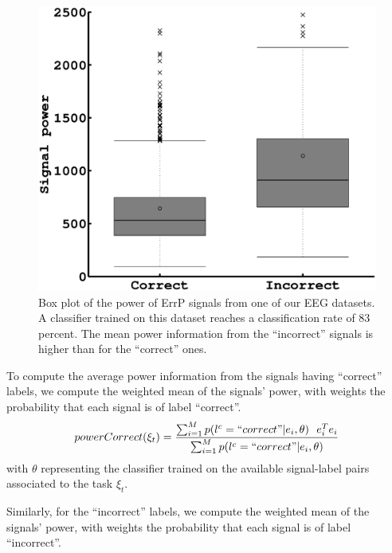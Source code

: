 \begin{figure}[!htbp]
\centering
\includegraphics[width=\columnwidth]{figures/power/powerdiff.eps}
\caption{Box plot of the power of ErrP signals from one of our EEG datasets. A classifier trained on this dataset reaches a classification rate of 83 percent. The mean power information from the ``incorrect'' signals is higher than for the ``correct'' ones.}
\label{fig:EEGpower}
\end{figure} 

To compute the average power information from the signals having ``correct'' labels, we compute the weighted mean of the signals' power, with weights the probability that each signal is of label ``correct''.
\begin{eqnarray}
powerCorrect(\xi_t) = \frac{\sum_{i = 1}^{M} p(l^c = ``correct"| e_i , \theta) ~~ e_i^T e_i}{\sum_{i = 1}^{M} p(l^c = ``correct"| e_i , \theta)}
\label{eq:powerCorrect}
\end{eqnarray}
with $\theta$ representing the classifier trained on the available signal-label pairs associated to the task $\xi_t$.

Similarly, for the ``incorrect'' labels, we compute the weighted mean of the signals' power, with weights the probability that each signal is of label ``incorrect''. 

